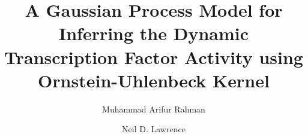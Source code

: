 \usepackage{subcaption}

\usepackage{booktabs} %
\usepackage{multirow}




\usepackage{amsfonts}
\usepackage{amsmath}
\usepackage{amssymb}
\usepackage{siunitx} %

\usepackage{flexisym}
\usepackage{pdfpages}
\usepackage{epstopdf}
\usepackage{epsfig}

\usepackage{changepage}%
\usepackage{lipsum}%

\usepackage{acronym}

\usepackage{tabulary}
\usepackage{tabularx}
\usepackage{makecell}
\usepackage{rotating}

\usepackage{stackengine}
\usepackage{url}
\usepackage{cite}
\usepackage{balance}

\renewcommand{\dateseparator}{--}
%
%





\title{A Gaussian Process Model for Inferring the Dynamic Transcription Factor Activity using Ornstein-Uhlenbeck Kernel}
\author{Muhammad Arifur Rahman
    \and Neil D. Lawrence}

